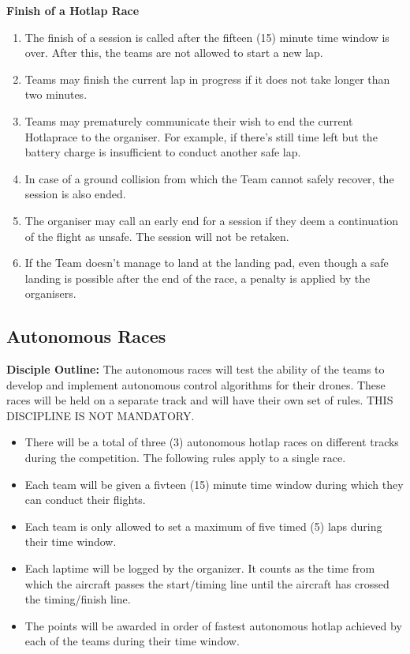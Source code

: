     \textbf{Finish of a Hotlap Race}
    \begin{enumerate}[resume]
      \item The finish of a session is called after the fifteen (15) minute time window is over. After this, the teams are not allowed to start a new lap.
      \item Teams may finish the current lap in progress if it does not take longer than two minutes.
      \item Teams may prematurely communicate their wish to end the current Hotlaprace to the organiser. For example, if there's still time left but the battery charge is insufficient to conduct another safe lap.
      \item In case of a ground collision from which the Team cannot safely recover, the session is also ended. 
      \item The organiser may call an early end for a session if they deem a continuation of the flight as unsafe. The session will not be retaken.  
      \item If the Team doesn't manage to land at the landing pad, even though a safe landing is possible after the end of the race, a penalty is applied by the organisers.
    \end{enumerate}

 

    \subsection{Autonomous Races}
    \textbf{Disciple Outline: }The autonomous races will test the ability of the teams to develop and implement autonomous control algorithms for their drones. These races will be held on a separate track and will have their own set of rules. THIS DISCIPLINE IS NOT MANDATORY.
 
    
    \begin{itemize}
      \item There will be a total of three (3) autonomous hotlap races on different tracks during the competition. The following rules apply to a single race.
      \item Each team will be given a fivteen (15) minute time window during which they can conduct their flights. 
      \item Each team is only allowed to set a maximum of five timed (5) laps during their time window. 
      \item Each laptime will be logged by the organizer. It counts as the time from which the aircraft passes the start/timing line until the aircraft has crossed the timing/finish line. 
      \item The points will be awarded in order of fastest autonomous hotlap achieved by each of the teams during their time window.
    \end{itemize}


